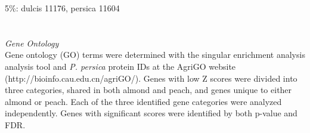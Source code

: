\documentclass[12pt]{article}
\begin{document}
5\%: dulcis 11176, persica 11604
\\
%
%
%
%
%
\\
%
\\
\emph{Gene Ontology}\\
Gene ontology (GO) terms were determined with the singular enrichment analysis analysis tool and \emph{P. persica} protein IDs at the AgriGO website (http://bioinfo.cau.edu.cn/agriGO/).
%
Genes with low Z scores were divided into three categories, shared in both almond and peach, and genes unique to either almond or peach. 
%
Each of the three identified gene categories were analyzed independently. 
%
Genes with significant scores were identified by both p-value and FDR.
%
\end{document}
